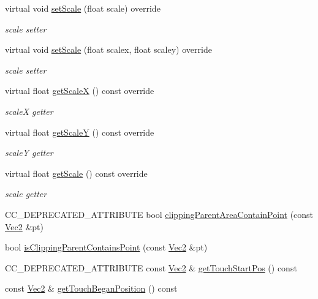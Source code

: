\begin{DoxyCompactItemize}
virtual void \hyperlink{classui_1_1Widget_a811bffaa1d3bae377c00a15edccb396f}{set\+Scale} (float scale) override
\begin{DoxyCompactList}\small\item\em scale setter \end{DoxyCompactList}\item 
virtual void \hyperlink{classui_1_1Widget_ace618234c5e35f66a9c569027cc9c5cf}{set\+Scale} (float scalex, float scaley) override
\begin{DoxyCompactList}\small\item\em scale setter \end{DoxyCompactList}\item 
virtual float \hyperlink{classui_1_1Widget_aca37ca371fdab9dc91dc554740b37e11}{get\+ScaleX} () const override
\begin{DoxyCompactList}\small\item\em scaleX getter \end{DoxyCompactList}\item 
virtual float \hyperlink{classui_1_1Widget_a932098cecbcccacf326a500f9c8177a7}{get\+ScaleY} () const override
\begin{DoxyCompactList}\small\item\em scaleY getter \end{DoxyCompactList}\item 
virtual float \hyperlink{classui_1_1Widget_ac4806c4d8ba815b1bb2a8f100527ab7b}{get\+Scale} () const override
\begin{DoxyCompactList}\small\item\em scale getter \end{DoxyCompactList}\item 
C\+C\+\_\+\+D\+E\+P\+R\+E\+C\+A\+T\+E\+D\+\_\+\+A\+T\+T\+R\+I\+B\+U\+TE bool \hyperlink{classui_1_1Widget_a6ec279041bfbb56c145ba69471cfef9b}{clipping\+Parent\+Area\+Contain\+Point} (const \hyperlink{classVec2}{Vec2} \&pt)
\item 
bool \hyperlink{classui_1_1Widget_a13fbdff1391a7936b8fd26d9257fc071}{is\+Clipping\+Parent\+Contains\+Point} (const \hyperlink{classVec2}{Vec2} \&pt)
\item 
C\+C\+\_\+\+D\+E\+P\+R\+E\+C\+A\+T\+E\+D\+\_\+\+A\+T\+T\+R\+I\+B\+U\+TE const \hyperlink{classVec2}{Vec2} \& \hyperlink{classui_1_1Widget_a6b930ace2f89e8fe077836d49701fda3}{get\+Touch\+Start\+Pos} () const
\item 
const \hyperlink{classVec2}{Vec2} \& \hyperlink{classui_1_1Widget_ad89b2e8f90a0a28b840d40519b504685}{get\+Touch\+Began\+Position} () const

\end{DoxyCompactItemize}
